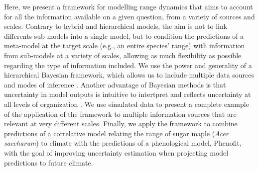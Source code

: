 Here, we present a framework for modelling range dynamics that aims to account for all the information available on a given question, from a variety of sources and scales.
Contrary to hybrid and hierarchical models, the aim is not to link differents sub-models into a single model, but to condition the predictions of a meta-model at the target scale (e.g., an entire species' range) with information from sub-models at a variety of scales, allowing as much flexibility as possible regarding the type of information included. 
We use the power and generality of a hierarchical Bayesian framework, which allows us to include multiple data sources and modes of inference \citep{Clark2005, VanOijen2005, Clark2006, Hobbs2011, Hartig2012}. 
Another advantage of Bayesian methods is that uncertainty in model outputs is intuitive to intertpret and reflects uncertainty at all levels of organization \citep{Clark2005, Cressie2009, Hobbs2011}. 
We use simulated data to present a complete example of the application of the framework to multiple information sources that are relevant at very different scales.
Finally, we apply the framework to combine predictions of a correlative model relating the range of sugar maple (\emph{Acer saccharum}) to climate with the predictions of a phenological model, Phenofit, with the goal of improving uncertainty estimation when projecting model predictions to future climate.

